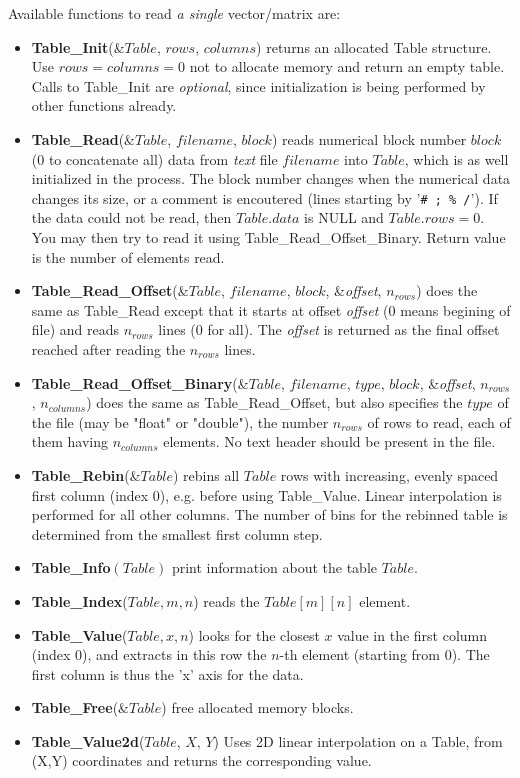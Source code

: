 Available functions to read \emph{a single} vector/matrix are:
\begin{itemize}
\item {\bf Table\_Init}(\&$Table$, $rows$, $columns$) returns an allocated
  Table structure. Use $rows=columns=0$ not to allocate memory and return an empty table.
  Calls to Table\_Init are \emph{optional}, since initialization is being
  performed by other functions already.
\item {\bf Table\_Read}(\&$Table$, $filename$, $block$)
  reads numerical block number
  $block$ (0 to concatenate all) data from \emph{text} file $filename$ into $Table$,
  which is as well initialized in the process.
  The block number changes when the numerical data changes its size,
  or a comment is encoutered (lines starting
  by '\verb+# ; % /+'). If the data could not be read,
  then $Table.data$ is NULL and $Table.rows = 0$.
  You may then try to read it using Table\_Read\_Offset\_Binary.
  Return value is the number of elements read.
\item {\bf Table\_Read\_Offset}(\&$Table$, $filename$, $block$, \&\textit{offset}, $n_{rows}$)
  does the same as Table\_Read except that it starts at offset \textit{offset}
  (0 means begining of file) and reads $n_{rows}$ lines (0 for all).
  The \textit{offset} is returned as the final offset reached after
  reading the $n_{rows}$ lines.
\item {\bf Table\_Read\_Offset\_Binary}(\&$Table$, $filename$, $type$,
  $block$, \&\textit{offset}, $n_{rows}$, $n_{columns}$) does the same as
  Table\_Read\_Offset, but also specifies the $type$ of the file (may
  be "float" or "double"), the number $n_{rows}$ of rows to read, each
  of them having $n_{columns}$ elements. No text header should be present
  in the file.
\item {\bf Table\_Rebin}(\&$Table$) rebins all $Table$ rows with increasing, evenly spaced first column (index 0), e.g. before using Table\_Value. Linear interpolation is performed for all other columns. The number of bins for the rebinned table is determined from the smallest first column step.
\item {\bf Table\_Info}$(Table)$ print information about the table $Table$.
\item {\bf Table\_Index}($Table, m, n$) reads the $Table[m][n]$ element.
\item {\bf Table\_Value}($Table, x, n$) looks for the closest $x$
  value in the first column (index 0), and extracts in this row the
  $n$-th element (starting from 0). The first column is thus the 'x' axis for the data.
\item {\bf Table\_Free}(\&$Table$) free allocated memory blocks.
\item {\bf Table\_Value2d}($Table$, $X$, $Y$) Uses 2D linear interpolation on a Table, from (X,Y) coordinates and returns the corresponding value.
\end{itemize}

